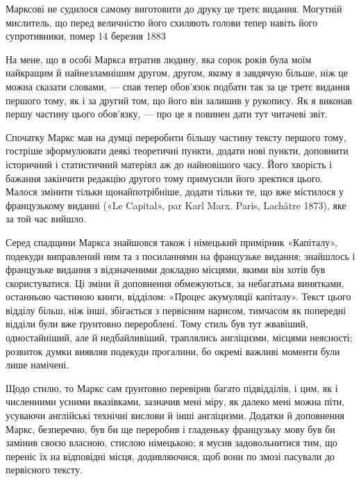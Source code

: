 

Марксові не судилося самому виготовити до друку це третє
видання. Могутній мислитель, що перед величністю його схиляють
голови тепер навіть його супротивники, помер 14 березня 1883~

На мене, що в особі Маркса втратив людину, яка сорок років
була моїм найкращим й найнезламнішим другом, другом, якому
я завдячую більше, ніж це можна сказати словами, — спав
тепер обов’язок подбати так за це третє видання першого тому,
як і за другий том, що його він залишив у рукопису. Як я виконав
першу частину цього обов’язку, — про це я повинен дати тут
читачеві звіт.

Спочатку Маркс мав на думці переробити більшу частину
тексту першого тому, гостріше зформулювати деякі теоретичні
пункти, додати нові пункти, доповнити історичний і статистичний
матеріял аж до найновішого часу. Його хворість і бажання
закінчити редакцію другого тому примусили його зректися цього.
Малося змінити тільки щонайпотрібніше, додати тільки те, що
вже містилося у французькому виданні («Le Capital», par Karl
Marx. Paris, Lachâtre 1873), яке за той час вийшло.

Серед спадщини Маркса знайшовся також і німецький примірник
«Капіталу», подекуди виправлений ним та з посиланнями
на французьке видання; знайшлось і французьке видання з
відзначеними докладно місцями, якими він хотів був скористуватися.
Ці зміни й доповнення обмежуються, за небагатьма винятками,
останньою частиною книги, відділом: «Процес акумуляції
капіталу». Текст цього відділу більш, ніж інші, збігається з первісним
нарисом, тимчасом як попередні відділи були вже ґрунтовно
перероблені. Тому стиль був тут жвавіший, одностайніший,
але й недбайливіший, траплялись англіцизми, місцями неясності;
розвиток думки виявляв подекуди прогалини, бо окремі важливі
моменти були лише намічені.

Щодо стилю, то Маркс сам ґрунтовно перевірив багато підвідділів,
і цим, як і численними усними вказівками, зазначив мені
міру, як далеко мені можна піти, усуваючи англійські технічні
вислови й інші англіцизми. Додатки й доповнення Маркс, безперечно,
був би ще переробив і гладеньку французьку мову був би
замінив своєю власною, стислою німецькою; я мусив задовольнитися
тим, що переніс їх на відповідні місця, додивляючися, щоб
вони по змозі пасували до первісного тексту.

